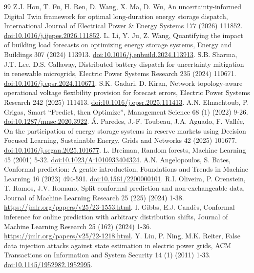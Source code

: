 \documentclass[preprint,12pt]{elsarticle}
\begin{document}
\begin{thebibliography}{99}
 Z.J. Hou, T. Fu, H. Ren, D. Wang, X. Ma, D. Wu, An uncertainty-informed Digital Twin framework for optimal long-duration energy storage dispatch, International Journal of Electrical Power \& Energy Systems 177 (2026) 111852. \href{https://doi.org/10.1016/j.ijepes.2026.111852}{doi:10.1016/j.ijepes.2026.111852}.
 L. Li, Y. Ju, Z. Wang, Quantifying the impact of building load forecasts on optimizing energy storage systems, Energy and Buildings 307 (2024) 113913. \href{https://doi.org/10.1016/j.enbuild.2024.113913}{doi:10.1016/j.enbuild.2024.113913}.
 S.B. Sharma, J.T. Lee, D.S. Callaway, Distributed battery dispatch for uncertainty mitigation in renewable microgrids, Electric Power Systems Research 235 (2024) 110671. \href{https://doi.org/10.1016/j.epsr.2024.110671}{doi:10.1016/j.epsr.2024.110671}.
 S.K. Gadari, D. Kiran, Network topology-aware operational voltage flexibility provision for forecast errors, Electric Power Systems Research 242 (2025) 111413. \href{https://doi.org/10.1016/j.epsr.2025.111413}{doi:10.1016/j.epsr.2025.111413}.
 A.N. Elmachtoub, P. Grigas, Smart ``Predict, then Optimize'', Management Science 68 (1) (2022) 9-26. \href{https://doi.org/10.1287/mnsc.2020.3922}{doi:10.1287/mnsc.2020.3922}.
 \'A. Paredes, J.-F. Toubeau, J.A. Aguado, F. Vall\'ee, On the participation of energy storage systems in reserve markets using Decision Focused Learning, Sustainable Energy, Grids and Networks 42 (2025) 101677. \href{https://doi.org/10.1016/j.segan.2025.101677}{doi:10.1016/j.segan.2025.101677}.
 L. Breiman, Random forests, Machine Learning 45 (2001) 5-32. \href{https://doi.org/10.1023/A:1010933404324}{doi:10.1023/A:1010933404324}.
 A.N. Angelopoulos, S. Bates, Conformal prediction: A gentle introduction, Foundations and Trends in Machine Learning 16 (2023) 494-591. \href{https://doi.org/10.1561/2200000101}{doi:10.1561/2200000101}.
 R.I. Oliveira, P. Orenstein, T. Ramos, J.V. Romano, Split conformal prediction and non-exchangeable data, Journal of Machine Learning Research 25 (225) (2024) 1-38. \url{https://jmlr.org/papers/v25/23-1553.html}.
 I. Gibbs, E.J. Cand\`es, Conformal inference for online prediction with arbitrary distribution shifts, Journal of Machine Learning Research 25 (162) (2024) 1-36. \url{https://jmlr.org/papers/v25/22-1218.html}.
 Y. Liu, P. Ning, M.K. Reiter, False data injection attacks against state estimation in electric power grids, ACM Transactions on Information and System Security 14 (1) (2011) 1-33. \href{https://doi.org/10.1145/1952982.1952995}{doi:10.1145/1952982.1952995}.

\end{thebibliography}
\end{document}
